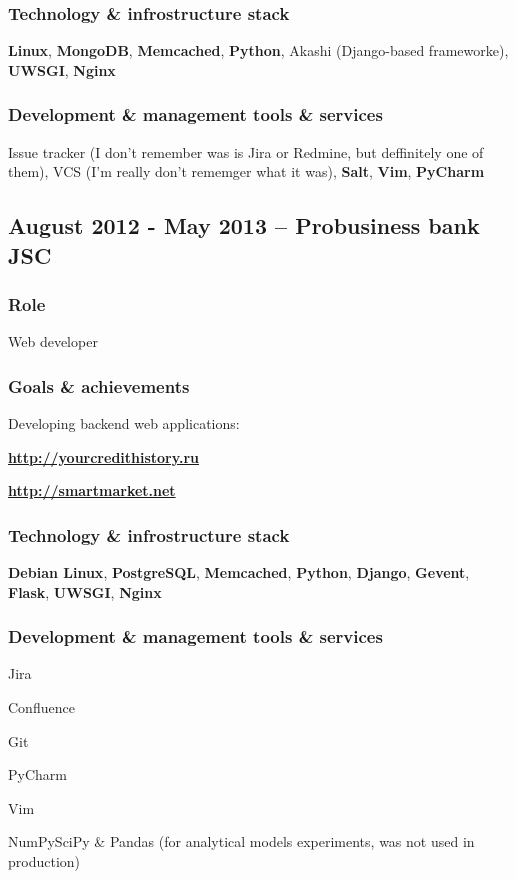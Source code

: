 \documentclass[10pt, a4paper, english]{article}
\begin{document}
    \subsubsection* {Technology \& infrostructure stack}
      \textbf{Linux}, \textbf{MongoDB}, \textbf{Memcached}, \textbf{Python}, Akashi (Django-based frameworke),
      \textbf{UWSGI}, \textbf{Nginx}
    \subsubsection* {Development \& management tools \& services}
      Issue tracker (I don't remember was is Jira or Redmine, but deffinitely one of them), VCS (I'm really
      don't rememger what it was), \textbf{Salt}, \textbf{Vim}, \textbf{PyCharm}

  \subsection* {August 2012 - May 2013 -- \textbf{Probusiness bank JSC}}
    \subsubsection* {Role}
      Web developer
    \subsubsection* {Goals \& achievements}
      Developing backend web applications:
      \begin {list}{\textbullet}{}
        \item \textbf{\url{http://yourcredithistory.ru}}
        \item \textbf{\url{http://smartmarket.net}}
      \end {list}
    \subsubsection* {Technology \& infrostructure stack}
      \textbf{Debian Linux}, \textbf{PostgreSQL}, \textbf{Memcached}, \textbf{Python}, \textbf{Django},
      \textbf{Gevent}, \textbf{Flask}, \textbf{UWSGI}, \textbf{Nginx}
    \subsubsection* {Development \& management tools \& services}
      \begin {list}{\textbullet}{}
        \item Jira
        \item Confluence
        \item Git
        \item PyCharm
        \item Vim
        \item NumPy\/SciPy \& Pandas (for analytical models experiments, was not used in production)
      \end{list}
\end{document}
